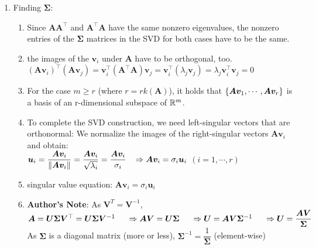 \begin{enumerate}
    \item Finding $\bm{\Sigma}$:
    \begin{enumerate}
        \item Since $\bm{AA^\top}$ and $\bm{A ^\top A}$ have the same nonzero eigenvalues, the nonzero entries of the $\bm{\Sigma}$ matrices in the SVD for both cases have to be the same.
        \hfill \cite{mfml/book/mml/Deisenroth-Faisal-Ong}

        \item  the images of the $\bm{v}_i$ under $\bm{A}$ have to be orthogonal, too.
        \hfill \cite{mfml/book/mml/Deisenroth-Faisal-Ong}
        \\
        $
            (\bm{Av}_i)^\top (\bm{Av}_j ) = 
            \bm{v}^\top _i(\bm{A}^\top \bm{A})\bm{v}_j = 
            \bm{v}^\top _i(\lambda _j\bm{v}_j ) = 
            \lambda _j\bm{v}^\top _i \bm{v}_j 
            = 0
        $
        \hfill \cite{mfml/book/mml/Deisenroth-Faisal-Ong}

        \item For the case $m \geq r$ (where $r = rk(\bm{A})$), it holds that $\left\{\bm{Av}_1, \cdots , \bm{Av}_r\right\}$ is a basis of an r-dimensional subspace of $\mathbb{R}^m$.
        \hfill \cite{mfml/book/mml/Deisenroth-Faisal-Ong}

        \item To complete the SVD construction, we need left-singular vectors that are orthonormal: 
        We normalize the images of the right-singular vectors $\bm{Av}_i$ and obtain:
        \hfill \cite{mfml/book/mml/Deisenroth-Faisal-Ong}
        \\
        $
            \bm{u}_i = \dfrac{\bm{Av}_i}{\left\| \bm{Av}_i \right\|}
            = \dfrac{\bm{Av}_i}{\sqrt{\lambda_i}}
            = \dfrac{\bm{Av}_i}{\sigma_i}
            \hspace{0.3cm}
            \Rightarrow 
            \bm{Av}_i = \sigma_i \bm{u}_i
        $
        \hfill
        $
            (i = 1, \cdots , r)
        $
        \hfill \cite{mfml/book/mml/Deisenroth-Faisal-Ong}

        \item singular value equation: $\bm{Av}_i = \sigma_i \bm{u}_i$
        \hfill \cite{mfml/book/mml/Deisenroth-Faisal-Ong}
        
        \item \textbf{Author's Note}: As $\bm{V}^T = \bm{V}^{-1}$,
        \\
        $
            \bm{A} = \bm{U\Sigma V}^\top = \bm{U\Sigma V}^{-1}
            \hspace{0.5cm}
            \Rightarrow 
            \bm{AV} = \bm{U\Sigma} 
            \hspace{0.5cm}
            \Rightarrow 
            \bm{U} = \bm{AV\Sigma}^{-1} 
            \hspace{0.5cm}
            \Rightarrow 
            \bm{U} = \dfrac{\bm{AV}}{\bm{\Sigma}}
        $
        \\
        As $\bm{\Sigma}$ is a diagonal matrix (more or less), $\bm{\Sigma}^{-1} = \dfrac{1}{\bm{\Sigma}}$ (element-wise)


\end{enumerate}
\end{enumerate}
